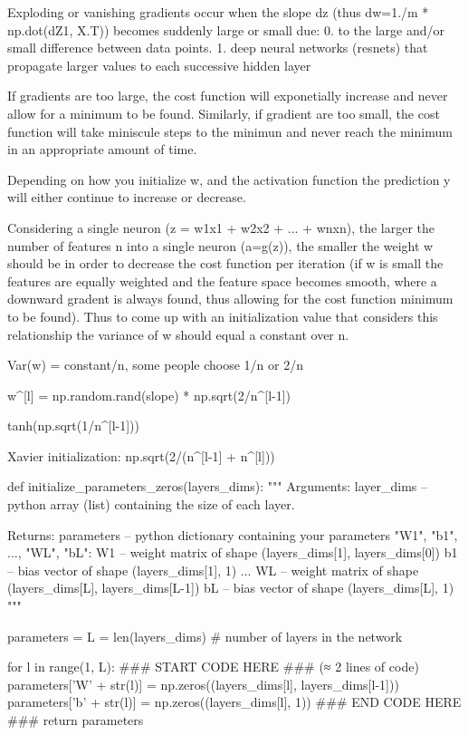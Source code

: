 \documentclass[11pt, onecolumn]{article}
\begin{document}
Exploding or vanishing gradients occur when the slope dz (thus dw=1./m * np.dot(dZ1, X.T)) becomes suddenly large or small due:
0. to the large and/or small difference between data points.
1. deep neural networks (resnets) that propagate larger values to each successive hidden layer

If gradients are too large, the cost function will exponetially increase and never allow for a minimum to be found.
Similarly, if gradient are too small, the cost function will take miniscule steps to the minimun and never reach the minimum in an appropriate amount of time.

Depending on how you initialize w, and the activation function the prediction y will either continue to increase or decrease.


Considering a single neuron (z = w1x1 + w2x2 + ... + wnxn), the larger the number of features n into a single neuron (a=g(z)), the smaller the weight w should be in order to decrease the cost function per iteration (if w is small the features are equally weighted and the feature space becomes smooth, where a downward gradent is always found, thus allowing for the cost function minimum to be found). Thus to come up with an initialization value that considers this relationship the variance of w should equal a constant over n.

Var(w) = constant/n, some people choose 1/n or 2/n

w^[l] = np.random.rand(slope) * np.sqrt(2/n^[l-1])


tanh(np.sqrt(1/n^[l-1]))

Xavier initialization:
np.sqrt(2/(n^[l-1] + n^[l]))


def initialize_parameters_zeros(layers_dims):
    """
    Arguments:
    layer_dims -- python array (list) containing the size of each layer.
    
    Returns:
    parameters -- python dictionary containing your parameters "W1", "b1", ..., "WL", "bL":
                    W1 -- weight matrix of shape (layers_dims[1], layers_dims[0])
                    b1 -- bias vector of shape (layers_dims[1], 1)
                    ...
                    WL -- weight matrix of shape (layers_dims[L], layers_dims[L-1])
                    bL -- bias vector of shape (layers_dims[L], 1)
    """
    
    parameters = {}
    L = len(layers_dims)            # number of layers in the network
    
    for l in range(1, L):
        ### START CODE HERE ### (≈ 2 lines of code)
        parameters['W' + str(l)] = np.zeros((layers_dims[l], layers_dims[l-1]))
        parameters['b' + str(l)] = np.zeros((layers_dims[l], 1))
        ### END CODE HERE ###
    return parameters
\end{document}
